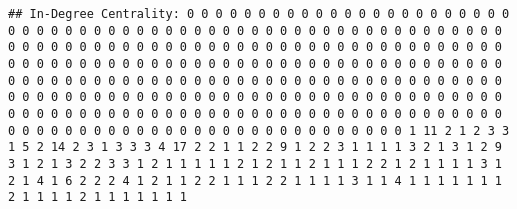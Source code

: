 \documentclass[
]{article}
\newenvironment{Shaded}{\begin{snugshade}}{\end{snugshade}}
\newcommand{\AttributeTok}[1]{\textcolor[rgb]{0.13,0.29,0.53}{#1}}
\newcommand{\FunctionTok}[1]{\textcolor[rgb]{0.13,0.29,0.53}{\textbf{#1}}}
\newcommand{\NormalTok}[1]{#1}
\newcommand{\OtherTok}[1]{\textcolor[rgb]{0.56,0.35,0.01}{#1}}
\newcommand{\SpecialCharTok}[1]{\textcolor[rgb]{0.81,0.36,0.00}{\textbf{#1}}}
\newcommand{\StringTok}[1]{\textcolor[rgb]{0.31,0.60,0.02}{#1}}
\begin{document}
\begin{Shaded}
\end{Shaded}

\begin{verbatim}
## In-Degree Centrality: 0 0 0 0 0 0 0 0 0 0 0 0 0 0 0 0 0 0 0 0 0 0 0 0 0 0 0 0 0 0 0 0 0 0 0 0 0 0 0 0 0 0 0 0 0 0 0 0 0 0 0 0 0 0 0 0 0 0 0 0 0 0 0 0 0 0 0 0 0 0 0 0 0 0 0 0 0 0 0 0 0 0 0 0 0 0 0 0 0 0 0 0 0 0 0 0 0 0 0 0 0 0 0 0 0 0 0 0 0 0 0 0 0 0 0 0 0 0 0 0 0 0 0 0 0 0 0 0 0 0 0 0 0 0 0 0 0 0 0 0 0 0 0 0 0 0 0 0 0 0 0 0 0 0 0 0 0 0 0 0 0 0 0 0 0 0 0 0 0 0 0 0 0 0 0 0 0 0 0 0 0 0 0 0 0 0 0 0 0 0 0 0 0 0 0 0 0 0 0 0 0 0 0 0 0 0 0 0 0 0 0 0 0 0 0 0 0 0 0 0 0 0 0 0 0 0 0 0 0 0 0 0 0 0 0 0 0 0 0 0 0 0 0 0 0 0 0 0 0 0 0 0 0 0 0 0 0 0 0 0 0 1 11 2 1 2 3 3 1 5 2 14 2 3 1 3 3 3 4 17 2 2 1 1 2 2 9 1 2 2 3 1 1 1 1 3 2 1 3 1 2 9 3 1 2 1 3 2 2 3 3 1 2 1 1 1 1 1 2 1 2 1 1 2 1 1 1 2 2 1 2 1 1 1 1 3 1 2 1 4 1 6 2 2 2 4 1 2 1 1 2 2 1 1 1 2 2 1 1 1 1 3 1 1 4 1 1 1 1 1 1 1 2 1 1 1 1 2 1 1 1 1 1 1 1
\end{verbatim}
\end{document}
